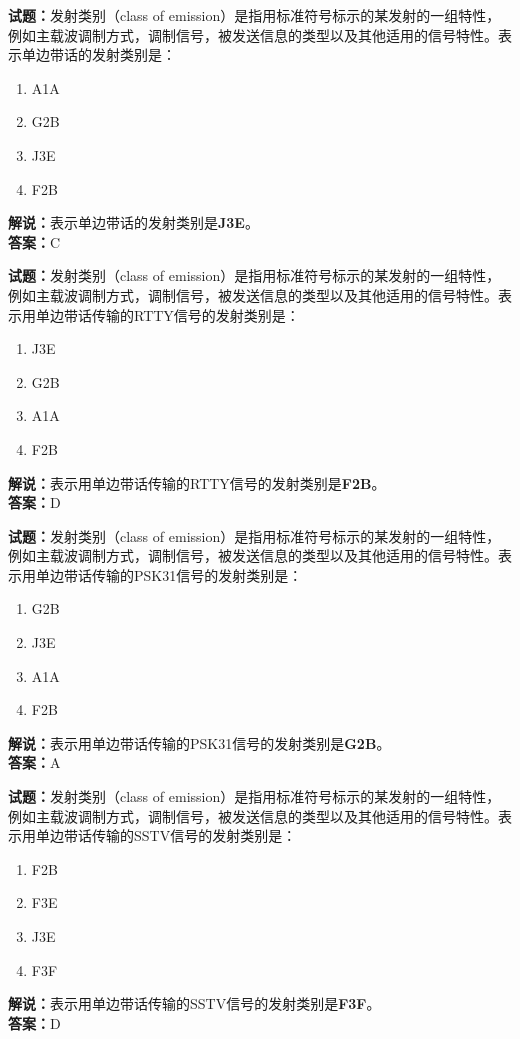 \documentclass{ctexbook}
\begin{document}
\bigskip




\noindent\textbf{试题：}发射类别（class of emission）是指用标准符号标示的某发射的一组特性，例如主载波调制方式，调制信号，被发送信息的类型以及其他适用的信号特性。表示单边带话的发射类别是：
\begin{enumerate}[leftmargin=3em]
\item A1A
\item G2B
\item J3E
\item F2B
\end{enumerate}
\noindent\textbf{解说：}表示单边带话的发射类别是\textbf{J3E}。\\\noindent\textbf{答案：}C

\bigskip




\noindent\textbf{试题：}发射类别（class of emission）是指用标准符号标示的某发射的一组特性，例如主载波调制方式，调制信号，被发送信息的类型以及其他适用的信号特性。表示用单边带话传输的RTTY信号的发射类别是：
\begin{enumerate}[leftmargin=3em]
\item J3E
\item G2B
\item A1A
\item F2B
\end{enumerate}
\noindent\textbf{解说：}表示用单边带话传输的RTTY信号的发射类别是\textbf{F2B}。\\\noindent\textbf{答案：}D

\bigskip




\noindent\textbf{试题：}发射类别（class of emission）是指用标准符号标示的某发射的一组特性，例如主载波调制方式，调制信号，被发送信息的类型以及其他适用的信号特性。表示用单边带话传输的PSK31信号的发射类别是：
\begin{enumerate}[leftmargin=3em]
\item G2B
\item J3E
\item A1A
\item F2B
\end{enumerate}
\noindent\textbf{解说：}表示用单边带话传输的PSK31信号的发射类别是\textbf{G2B}。\\\noindent\textbf{答案：}A

\bigskip




\noindent\textbf{试题：}发射类别（class of emission）是指用标准符号标示的某发射的一组特性，例如主载波调制方式，调制信号，被发送信息的类型以及其他适用的信号特性。表示用单边带话传输的SSTV信号的发射类别是：
\begin{enumerate}[leftmargin=3em]
\item F2B
\item F3E
\item J3E
\item F3F
\end{enumerate}
\noindent\textbf{解说：}表示用单边带话传输的SSTV信号的发射类别是\textbf{F3F}。\\\noindent\textbf{答案：}D
\end{document}
